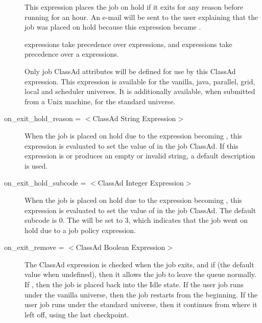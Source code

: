 \begin{description}
This expression places the job on hold if it exits for any reason
before running for an hour. An e-mail will be sent to the user explaining
that the job was placed on hold because this expression became .

 expressions take
precedence over  expressions,
and  expressions take
precedence over a  expressions.

Only job ClassAd attributes will be defined for use by this ClassAd expression.
This expression is available for the vanilla, java, parallel, grid,
local and scheduler universes.
It is additionally available, when submitted from a Unix machine,
for the standard universe.

\item[on\_exit\_hold\_reason = $<$ClassAd String Expression$>$]
When the job is placed on hold due to the 
expression becoming , this expression is evaluated to
set the value of  in the job ClassAd.
If this expression is  or produces an empty or invalid string,
a default description is used.

\item[on\_exit\_hold\_subcode = $<$ClassAd Integer Expression$>$]
When the job is placed on hold due to the 
expression becoming , this expression is evaluated to set the
value of  in the job ClassAd.
The default subcode is 0.  The  will be set to 3, which
indicates that the job went on hold due to a job policy expression.



\label{condor-submit-on-exit-remove}
\item[on\_exit\_remove = $<$ClassAd Boolean Expression$>$] 
The ClassAd expression is checked when the job exits, and if 
(the default value when undefined),
then it allows the job to leave the queue normally.
If , then the job is placed back into the Idle state.
If the user job runs under the vanilla universe,
then the job restarts from the beginning.
If the user job runs under the standard universe,
then it continues from where it left off, using the last checkpoint.


\end{description}
